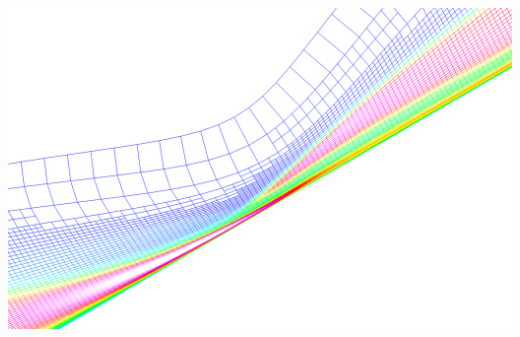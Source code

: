 \documentclass[compress,11pt]{beamer}
\begin{document}
{\begin{columns}[t]
\begin{center}
	\includegraphics[width=\textwidth]{figures/holden_hollow_cylinder/amr2}
      \end{center}
  \end{columns}
}
\end{document}
